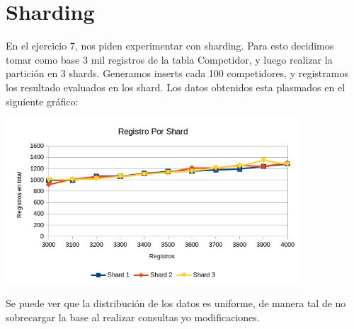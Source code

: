 \section{Sharding}


En el ejercicio 7, nos piden experimentar con sharding.
Para esto decidimos tomar como base 3 mil registros de la tabla Competidor, y luego realizar la partición en 3 shards.
Generamos inserts cada 100 competidores, y registramos los resultado evaluados en los shard.
Los datos obtenidos esta plasmados en el siguiente gráfico:

\begin{center}
\includegraphics[width=11cm,keepaspectratio]{./imagenes/shard.png}\newline
\end{center}

Se puede ver que la distribución de los datos es uniforme, de manera tal de no sobrecargar la base al realizar consultas y\/o modificaciones.